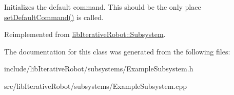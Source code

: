 Initializes the default command. This should be the only place \mbox{\hyperlink{classlib_iterative_robot_1_1_subsystem_a6fff5c5756245ac750c2b26ee0ed2be7}{set\+Default\+Command()}} is called. 

Reimplemented from \mbox{\hyperlink{classlib_iterative_robot_1_1_subsystem_a30bd6c33c84c896f31ed01c8331aab57}{lib\+Iterative\+Robot\+::\+Subsystem}}.



The documentation for this class was generated from the following files\+:\begin{DoxyCompactItemize}
\item 
include/lib\+Iterative\+Robot/subsystems/Example\+Subsystem.\+h\item 
src/lib\+Iterative\+Robot/subsystems/Example\+Subsystem.\+cpp\end{DoxyCompactItemize}
